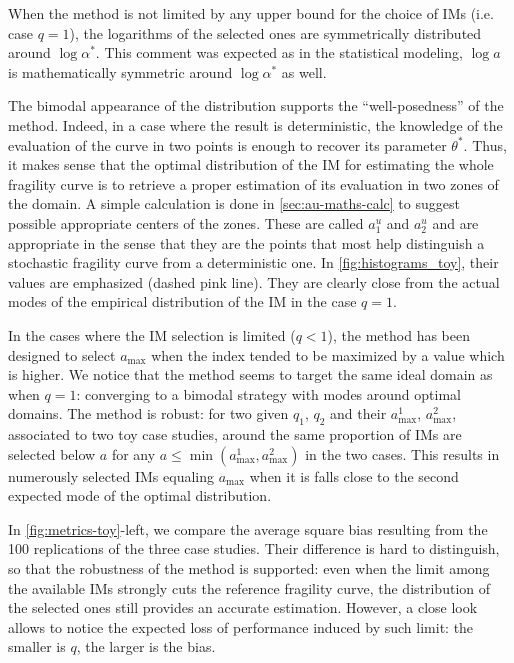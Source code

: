     
    When the method is not limited by any upper bound for the choice of IMs (i.e. case $q=1$), 
    the logarithms of the selected ones are symmetrically distributed around $\log\alpha^\ast$. This comment was expected as in the statistical modeling, $\log a$ is mathematically symmetric around $\log\alpha^\ast$ as well.
    
    The bimodal appearance of the distribution supports the ``well-posedness'' of the method. Indeed, in a case where the result is deterministic, the knowledge of the evaluation of the curve in two points is enough to recover its parameter $\theta^\ast$. Thus, it makes sense that the optimal distribution of the IM for estimating the whole fragility curve is to retrieve a proper estimation of its evaluation in two zones of the domain.
    A simple calculation is done in \cref{sec:au-maths-calc} to suggest possible appropriate centers of the zones. 
    {These are called $a^u_1$ and $a^u_2$ and are appropriate in the sense that they are the points that most help distinguish a stochastic fragility curve from a deterministic one.}
    In  \cref{fig:histograms_toy}, their values are emphasized (dashed pink line). They are clearly close from the actual modes of the empirical distribution of the IM in the case $q=1$.
    
    
    In the cases where the IM selection is limited ($q<1$), the method has been designed to select $a_{\text{max}}$ when the index tended to be maximized by a value which is higher.
    We notice that the method seems to target the same ideal domain as when $q=1$: converging to a bimodal strategy with modes around optimal domains. The method is robust: for two given $q_1$, $q_2$ and their $a_{\text{max}}^1$, $a_{\text{max}}^2$, associated to two toy case studies, around the same proportion of IMs are selected below $a$ for any $a\leq\min(a_{\text{max}}^1, a_{\text{max}}^2)$ in the two cases.
    This results in numerously selected IMs equaling $a_{\text{max}}$ when it is falls close to the second expected mode of the optimal distribution.
    
    In  \cref{fig:metrics-toy}-left, we compare the average square bias
    resulting from the 100 replications of the three case studies.
    Their difference is hard to distinguish, so that the robustness of the method is supported: even when the limit among the available IMs strongly cuts the reference fragility curve, the distribution of the selected ones still provides an accurate estimation.
    However, a close look allows to notice the expected loss of performance induced by such limit: the smaller is $q$, the larger is the bias.
    
